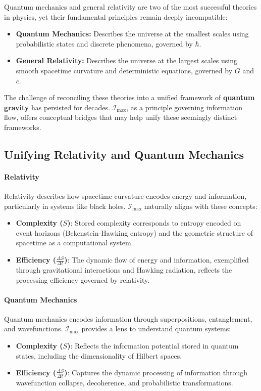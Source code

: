 \documentclass[12pt]{article}
\begin{document}
Quantum mechanics and general relativity are two of the most successful theories in physics, yet their fundamental principles remain deeply incompatible:
\begin{itemize}
    \item \textbf{Quantum Mechanics:} Describes the universe at the smallest scales using probabilistic states and discrete phenomena, governed by \(\hbar\).
    \item \textbf{General Relativity:} Describes the universe at the largest scales using smooth spacetime curvature and deterministic equations, governed by \(G\) and \(c\).
\end{itemize}

The challenge of reconciling these theories into a unified framework of \textbf{quantum gravity} has persisted for decades. \(\mathcal{I}_{\text{max}}\), as a principle governing information flow, offers conceptual bridges that may help unify these seemingly distinct frameworks.

\subsection{Unifying Relativity and Quantum Mechanics}

\paragraph{Relativity}
Relativity describes how spacetime curvature encodes energy and information, particularly in systems like black holes. \(\mathcal{I}_{\text{max}}\) naturally aligns with these concepts:
\begin{itemize}
    \item \textbf{Complexity (\(S\))}: Stored complexity corresponds to entropy encoded on event horizons (Bekenstein-Hawking entropy) and the geometric structure of spacetime as a computational system.
    \item \textbf{Efficiency (\(\frac{\Delta S}{\Delta t}\))}: The dynamic flow of energy and information, exemplified through gravitational interactions and Hawking radiation, reflects the processing efficiency governed by relativity.
\end{itemize}

\paragraph{Quantum Mechanics}
Quantum mechanics encodes information through superpositions, entanglement, and wavefunctions. \(\mathcal{I}_{\text{max}}\) provides a lens to understand quantum systems:
\begin{itemize}
    \item \textbf{Complexity (\(S\))}: Reflects the information potential stored in quantum states, including the dimensionality of Hilbert spaces.
    \item \textbf{Efficiency (\(\frac{\Delta S}{\Delta t}\))}: Captures the dynamic processing of information through wavefunction collapse, decoherence, and probabilistic transformations.
\end{itemize}
\end{document}
